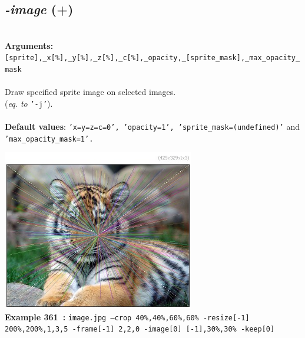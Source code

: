 \documentclass[a4paper,11pt,twoside]{book}
\begin{document}
\subsection{\emph{-image} (+)}\vspace*{-0.5em}
~\\\textbf{Arguments: } 
{\small \texttt{[sprite],\_x[\%],\_y[\%],\_z[\%],\_c[\%],\_opacity,\_[sprite\_mask],\_max\_opacity\_mask}}\\~\\
Draw specified sprite image on selected images.
~\\(\emph{eq. to} {\small \texttt{'-j'}}).
~\\~\\\textbf{Default values}: {\small \texttt{'x=y=z=c=0', 'opacity=1', 'sprite\_mask=(undefined)'} and \texttt{'max\_opacity\_mask=1'.}}
\begin{center}\includegraphics[keepaspectratio=true,height=7cm,width=\textwidth]{img/gmic_def361.jpg}\\
{\footnotesize \textbf{Example 361~:} \texttt{image.jpg --crop 40\%,40\%,60\%,60\% -resize[-1] 200\%,200\%,1,3,5 -frame[-1] 2,2,0 -image[0] [-1],30\%,30\% -keep[0]}}
\end{center}
\end{document}
